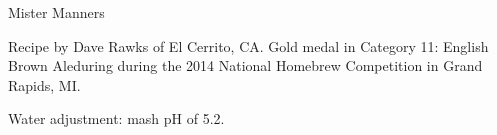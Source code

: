 \begin{recipe}{Mister Manners} %

\begin{aboutblock}
Recipe by Dave Rawks of El Cerrito, CA. Gold medal in Category 11: English Brown
Aleduring during the 2014 National Homebrew Competition in Grand Rapids, MI.
\sourceaha
\end{aboutblock}


\begin{methodandtiming}

\begin{mashsteps}
\end{mashsteps}

\begin{fermentationsteps}
\end{fermentationsteps}

\begin{directions}
Water adjustment: mash pH of 5.2.
\end{directions}

\end{methodandtiming}

\recipebreak

\begin{ingredientsblock}

\begin{malts}
\end{malts}

\begin{hops}
\end{hops}


\end{ingredientsblock}

\end{recipe}

